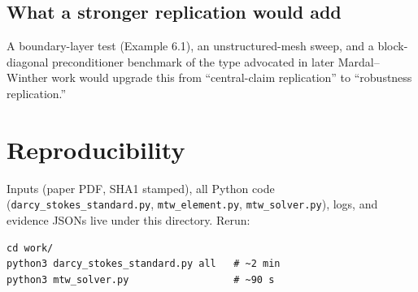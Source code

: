 \documentclass[11pt]{article}
\begin{document}
\subsection*{What a stronger replication would add}
A boundary-layer test (Example 6.1), an unstructured-mesh sweep, and a
block-diagonal preconditioner benchmark of the type advocated in later
Mardal--Winther work would upgrade this from ``central-claim
replication'' to ``robustness replication.''

\section*{Reproducibility}
Inputs (paper PDF, SHA1 stamped), all Python code
(\texttt{darcy\_stokes\_standard.py}, \texttt{mtw\_element.py},
\texttt{mtw\_solver.py}), logs, and evidence JSONs live under this
directory.  Rerun:
\begin{verbatim}
cd work/
python3 darcy_stokes_standard.py all   # ~2 min
python3 mtw_solver.py                  # ~90 s
\end{verbatim}
\end{document}
